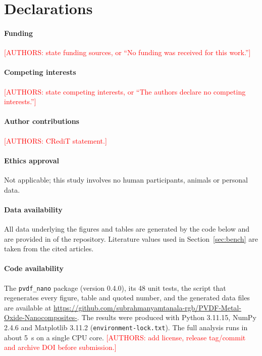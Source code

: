 \documentclass[11pt,a4paper]{article}
\begin{document}
\section*{Declarations}
\paragraph{Funding} \textcolor{red}{[AUTHORS: state funding sources, or ``No funding was received for this work.'']}

\paragraph{Competing interests} \textcolor{red}{[AUTHORS: state competing interests, or ``The authors declare no competing interests.'']}

\paragraph{Author contributions} \textcolor{red}{[AUTHORS: CRediT statement.]}

\paragraph{Ethics approval} Not applicable; this study involves no human participants, animals or personal data.

\paragraph{Data availability} All data underlying the figures and tables are generated by the code below and are provided in  of the repository. Literature values used in Section~\ref{sec:bench} are taken from the cited articles.

\paragraph{Code availability} The \texttt{pvdf\_nano} package (version 0.4.0), its 48 unit tests, the script  that regenerates every figure, table and quoted number, and the generated data files are available at \url{https://github.com/subrahmanyamtanala-rgb/PVDF-Metal-Oxide-Nanocomposites-}. The results were produced with Python 3.11.15, NumPy 2.4.6 and Matplotlib 3.11.2 (\texttt{environment-lock.txt}). The full analysis runs in about 5~s on a single CPU core. \textcolor{red}{[AUTHORS: add license, release tag/commit and archive DOI before submission.]}
\end{document}
